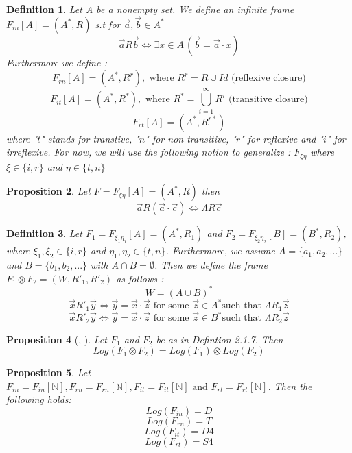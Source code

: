 \documentclass[12pt, a4paper]{scrartcl}
\newtheorem{definition}{Definition}[subsection]
\newtheorem{proposition}[definition]{Proposition}
\begin{document}
\begin{definition}
    Let A be a nonempty set. We define an infinite frame $F_{in}[A] = (A^*, R)$ s.t for $\vec{a}, \vec{b} \in A^*$ 
    $$\vec{a}R\vec{b} \Leftrightarrow \exists x \in A \, (\vec{b} = \vec{a} \cdot x)$$
    Furthermore we define : 
    $$F_{rn}[A] = (A^*,R^r), \mbox{ where } R^r = R \cup Id \mbox{ (reflexive closure)}$$
    $$F_{it}[A] = (A^*,R^*), \mbox{ where } R^* = \bigcup_{i=1}^{\infty}R^i \mbox{ (transitive closure)}$$
    $$F_{rt}[A] = (A^*, R^{r*})$$ \newline
    where "$t$" stands for transtive, "$n$" for non-transitive, "$r$" for reflexive and "$i$" for irreflexive. \newline
    For now, we will use the following notion to generalize : $F_{\xi \eta}$ where $\xi \in \{i,r\}$ and $\eta \in \{t,n\}$ \newline
\end{definition}

\begin{proposition}
    Let $F =F_{\xi \eta}[A] = (A^*, R)$ then $$\vec{a}R(\vec{a} \cdot \vec{c}) \Leftrightarrow \Lambda R \vec{c}$$ 
\end{proposition}

\begin{definition}
    Let $F_1 = F_{\xi_1 \eta_1}[A] = (A^*,R_1)$ and $F_2 = F_{\xi_2 \eta_2}[B] = (B^*,R_2)$, where $\xi_1, \xi_2 \in \{i,r\}$ 
    and $\eta_1, \eta_2 \in \{t,n\}$. Furthermore, we assume $A = \{a_1, a_2,...\}$ and $B = \{b_1,b_2,...\}$ with $A \cap B = \emptyset$. Then we define the frame $F_1 \otimes F_2 = (W, R'_1, R'_2)$ as follows :
    $$W = (A \cup B)^*$$
    $$\vec{x} R'_1 \vec{y} \Leftrightarrow \vec{y} = \vec{x} \cdot \vec{z} \mbox{ for some } \vec{z} \in A^* \mbox{such that }\Lambda R_1 \vec{z}$$
    $$\vec{x} R'_2 \vec{y} \Leftrightarrow \vec{y} = \vec{x} \cdot \vec{z} \mbox{ for some } \vec{z} \in B^* \mbox{such that }\Lambda R_2 \vec{z}$$ \newline
\end{definition}

\begin{proposition} [\cite{ref6}, \cite{ref4}]
    Let $F_1$ and $F_2$ be as in Defintion 2.1.7. Then 
    $$Log(F_1 \otimes F_2) = Log(F_1) \otimes Log(F_2)$$
\end{proposition}

\begin{proposition}
    Let $F_{in} = F_{in}[\mathbb{N}], F_{rn} = F_{rn}[\mathbb{N}], F_{it} = F_{it}[\mathbb{N}] \mbox{ and } F_{rt} = F_{rt}[\mathbb{N}]$. Then the following holds: \newline 
    $$ Log(F_{in}) = D$$
    $$ Log(F_{rn}) = T$$
    $$ Log(F_{it}) = D4$$
    $$ Log(F_{rt}) = S4$$

\end{proposition}
\end{document}

